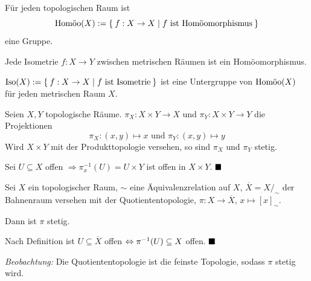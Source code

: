 \begin{bemerkung}
    \begin{bemenum}
        \item {}Für jeden topologischen Raum ist 
              \[\Homoo(X) := \Set{f: X \rightarrow X | f \text{ ist Homöomorphismus}}\]
              eine Gruppe.
        \item {}Jede Isometrie $f:X \rightarrow Y$ zwischen metrischen 
              Räumen ist ein Homöomorphismus.
        \item {}$\Iso(X) := \Set{f:X \rightarrow X | f \text{ ist Isometrie}}$ ist
              eine Untergruppe von $\Homoo(X)$ für jeden
              metrischen Raum $X$.
    \end{bemenum}
\end{bemerkung}

\begin{bemerkung}
    Seien $X, Y$ topologische Räume. $\pi_X: X \times Y \rightarrow X$
    und $\pi_Y: X \times Y \rightarrow Y$ die Projektionen 
    \[\pi_X: (x,y) \mapsto x \text{ und } \pi_Y: (x,y) \mapsto y\]
    Wird $X \times Y$ mit der Produkttopologie versehen, so sind $\pi_X$
    und $\pi_Y$ stetig.
\end{bemerkung}

\begin{beweis}
    Sei $U \subseteq X$ offen $\Rightarrow \pi_x^{-1} (U) = U \times Y$ 
    ist offen in $X \times Y$. $\qed$
\end{beweis}

\begin{bemerkung}
    Sei $X$ ein topologischer Raum, $\sim$ eine Äquivalenzrelation auf
    $X$, $\overline{X} = X /_\sim$ der Bahnenraum versehen mit der
    Quotiententopologie, $\pi:X \rightarrow \overline{X}$, $x \mapsto [x]_\sim$.

    Dann ist $\pi$ stetig.
\end{bemerkung}

\begin{beweis}
    Nach Definition ist 
    $U \subseteq \overline{X}$ offen $\gdw \pi^{-1}(U) \subseteq X$ 
    offen. $\qed$
\end{beweis}

\emph{Beobachtung:} Die Quotiententopologie ist die feinste Topologie,
sodass $\pi$ stetig wird.

